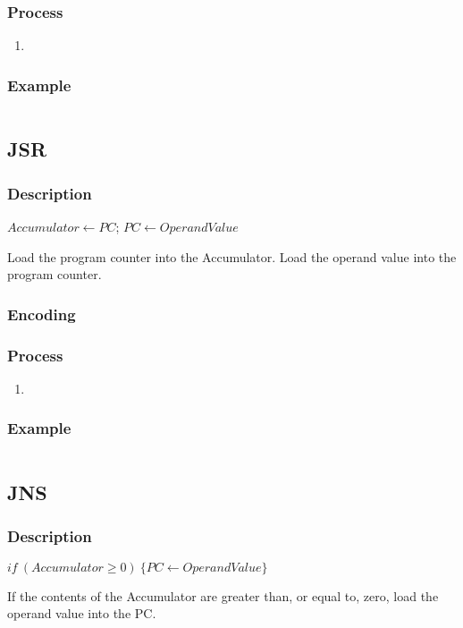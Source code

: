     \subsubsection{Process}
    \begin{enumerate}
        \item
    \end{enumerate}

    \subsubsection{Example}
    \begin{verbatim}
    \end{verbatim}

\subsection{JSR}\label{subsec:jsr}
    \subsubsection{Description}
    $Accumulator \leftarrow PC$; $PC \leftarrow OperandValue$
    \par Load the program counter into the Accumulator.
    Load the operand value into the program counter.
    \subsubsection{Encoding}
    \subsubsection{Process}
    \begin{enumerate}
        \item
    \end{enumerate}

    \subsubsection{Example}
    \begin{verbatim}
    \end{verbatim}

\subsection{JNS}\label{subsec:jns}
    \subsubsection{Description}
    $if\ (Accumulator \geq 0)\ \{ PC \leftarrow OperandValue \}$
    \par If the contents of the Accumulator are greater than, or equal to, zero, load the operand value into the PC\@.
